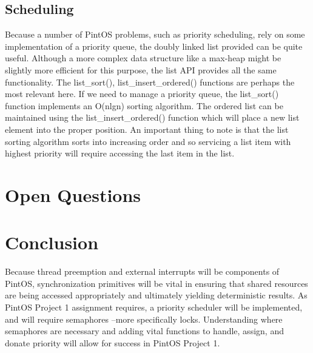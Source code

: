 \documentclass[11pt, letterpaper]{article}
\begin{document}
\subsection{Scheduling}

Because a number of PintOS problems, such as priority scheduling, rely on some implementation of a priority queue, the doubly linked list provided can be quite useful. Although a more complex data structure like a max-heap might be slightly more efficient for this purpose, the list API provides all the same functionality. The list\_sort(), list\_insert\_ordered() functions are perhaps the most relevant here. If we need to manage a priority queue, the list\_sort() function implements an O(nlgn) sorting algorithm. The ordered list can be maintained using the list\_insert\_ordered() function which will place a new list element into the proper position. An important thing to note is that the list sorting algorithm sorts into increasing order and so servicing a list item with highest priority will require accessing the last item in the list.

\section*{Open Questions}


\section*{Conclusion}

Because thread preemption and external interrupts will be components of PintOS, synchronization primitives will be vital in ensuring that shared resources are being accessed appropriately and ultimately yielding deterministic results. As PintOS Project 1 assignment requires, a priority scheduler will be implemented, and will require semaphores --more specifically locks. Understanding where semaphores are necessary and adding vital functions to handle, assign, and donate priority will allow for success in PintOS Project 1.
\end{document}
